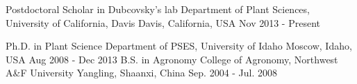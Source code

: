 


\begin{cventries}

\cventry
{Postdoctoral Scholar in Dubcovsky’s lab}
{Department of Plant Sciences, University of California, Davis}
{Davis, California, USA}
{Nov 2013 - Present}
{}

\cventry
{Ph.D. in Plant Science} %
{Department of PSES, University of Idaho} %
{Moscow, Idaho, USA} %
{Aug 2008 - Dec 2013} %
{}
\cventry
{B.S. in Agronomy} %
{College of Agronomy, Northwest A\&F University} %
{Yangling, Shaanxi, China} %
{Sep. 2004 - Jul. 2008} %
{ %
}


\end{cventries}